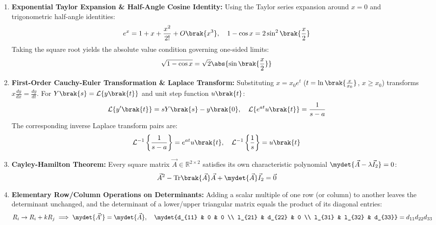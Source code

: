 \begin{enumerate}[label=\thesubsection.\arabic*, ref=\thesubsection.\theenumi]
	
	\item \textbf{Exponential Taylor Expansion \& Half-Angle Cosine Identity:}
	Using the Taylor series expansion around $x = 0$ and trigonometric half-angle identities:
	\begin{align}
		e^x = 1 + x + \frac{x^2}{2!} + O\brak{x^3}, \quad 1 - \cos x = 2\sin^2\brak{\frac{x}{2}} \label{eq:exp_taylor}
	\end{align}
	Taking the square root yields the absolute value condition governing one-sided limits:
	\begin{align}
		\sqrt{1 - \cos x} = \sqrt{2}\abs{\sin\brak{\frac{x}{2}}} \label{eq:half_angle_cos}
	\end{align}
	
	\item \textbf{First-Order Cauchy-Euler Transformation \& Laplace Transform:}
	Substituting $x = x_0 e^t$ ($t = \ln\brak{\frac{x}{x_0}}$, $x \ge x_0$) transforms $x\frac{dy}{dx} = \frac{dy}{dt}$. For $Y\brak{s} = \mathcal{L}\{y\brak{t}\}$ and unit step function $u\brak{t}$:
	\begin{align}
		\mathcal{L}\{y'\brak{t}\} = sY\brak{s} - y\brak{0}, \quad \mathcal{L}\{e^{at}u\brak{t}\} = \frac{1}{s - a} \label{eq:laplace_cauchy_euler}
	\end{align}
	The corresponding inverse Laplace transform pairs are:
	\begin{align}
		\mathcal{L}^{-1}\left\{\frac{1}{s - a}\right\} = e^{at}u\brak{t}, \quad \mathcal{L}^{-1}\left\{\frac{1}{s}\right\} = u\brak{t} \label{eq:inv_laplace_pairs}
	\end{align}
	
	\item \textbf{Cayley-Hamilton Theorem:}
	Every square matrix $\vec{A} \in \mathbb{R}^{2 \times 2}$ satisfies its own characteristic polynomial $\mydet{\vec{A} - \lambda\vec{I}_2} = 0$:
	\begin{align}
		\vec{A}^2 - \text{Tr}\brak{\vec{A}}\vec{A} + \mydet{\vec{A}}\vec{I}_2 = \vec{0} \label{eq:cayley_hamilton_formula}
	\end{align}
	
	\item \textbf{Elementary Row/Column Operations on Determinants:}
	Adding a scalar multiple of one row (or column) to another leaves the determinant unchanged, and the determinant of a lower/upper triangular matrix equals the product of its diagonal entries:
	\begin{align}
		R_i \to R_i + k R_j \implies \mydet{\vec{A}'} = \mydet{\vec{A}}, \quad \mydet{d_{11} & 0 & 0 \\ l_{21} & d_{22} & 0 \\ l_{31} & l_{32} & d_{33}} = d_{11}d_{22}d_{33} \label{eq:det_prop_identity}
	\end{align}
	

\end{enumerate}
